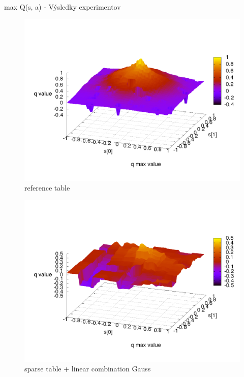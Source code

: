 max Q(s, a) - Výsledky experimentov


\begin{figure}[!htb]
\centering
\includegraphics[scale=.4]{../../results_q_learning/map_1/function_type_0/iterations_10/q_learning_result.png}
\caption{reference table}
\end{figure}


\begin{figure}[!htb]
\centering
\includegraphics[scale=.4]{../../results_q_learning/map_1/function_type_3/iterations_10/q_learning_result.png}
\caption{sparse table + linear combination Gauss}
\end{figure}




